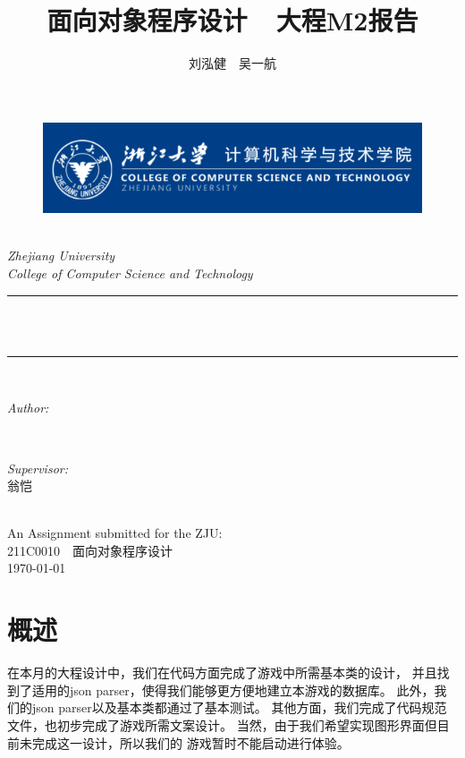 \documentclass[UTF8]{ctexart}
\title{\heiti 面向对象程序设计\ \ 大程M2报告}
\author{\Large \kaishu \textup{刘泓健\ \ 吴一航}}
\begin{document}
\begin{titlepage}
	\newcommand{\HRule}{\rule{\linewidth}{0.5mm}}
	\begin{figure}
        \flushleft
        \includegraphics[scale=0.4]{0.png}
    \end{figure}
    \center 
	\quad\\[1.5cm]
	\textsl{\Large Zhejiang University }\\[0.5cm] 
	\textsl{\large College of Computer Science and Technology}\\[0.5cm] 
	\makeatletter
	\HRule \\[0.4cm]
	{ \huge \bfseries \@title}\\[0.4cm] 
	\HRule \\[1.5cm]
	\begin{minipage}{0.4\textwidth}
		\begin{flushleft} \Large
			\emph{Author:}\\
			\@author 
		\end{flushleft}
	\end{minipage}
	~
	\begin{minipage}{0.4\textwidth}
		\begin{flushright} \Large \kaishu
			\emph{Supervisor:} \\
			\textup{翁恺}
		\end{flushright}
	\end{minipage}\\[3cm]
	\makeatother
	{\large An Assignment submitted for the ZJU:}\\[0.5cm]
	{\large {211C0010\ \ 面向对象程序设计}}\\[0.5cm]
	{\large \today}\\[2cm] 
	\vfill 
\end{titlepage}
    
    \section{概述}
    在本月的大程设计中，我们在代码方面完成了游戏中所需基本类的设计，
    并且找到了适用的json parser，使得我们能够更方便地建立本游戏的数据库。
    此外，我们的json parser以及基本类都通过了基本测试。
    其他方面，我们完成了代码规范文件，也初步完成了游戏所需文案设计。
    当然，由于我们希望实现图形界面但目前未完成这一设计，所以我们的
    游戏暂时不能启动进行体验。
\end{document}
